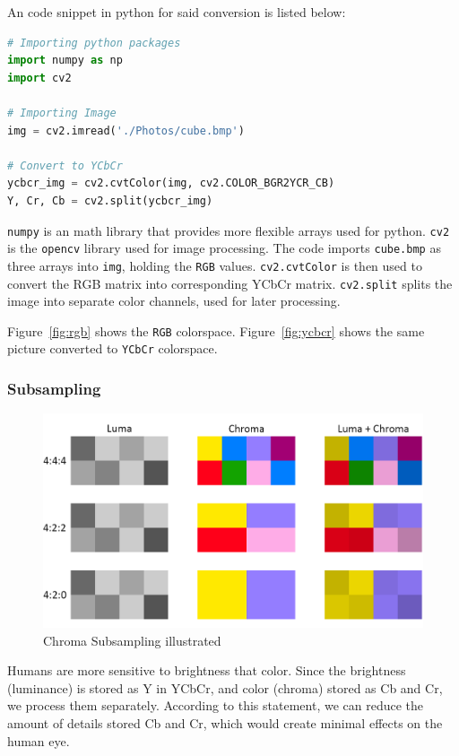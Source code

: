 \documentclass{article}
\begin{document}
An code snippet in python for said conversion is listed below:
\begin{lstlisting}[language=Python]
# Importing python packages
import numpy as np
import cv2

# Importing Image
img = cv2.imread('./Photos/cube.bmp')

# Convert to YCbCr
ycbcr_img = cv2.cvtColor(img, cv2.COLOR_BGR2YCR_CB)
Y, Cr, Cb = cv2.split(ycbcr_img)
\end{lstlisting}

\texttt{numpy} is an math library that provides more flexible arrays used for python.
\texttt{cv2} is the \texttt{opencv} library used for image processing.
The code imports \texttt{cube.bmp} as three arrays into \texttt{img}, holding the \texttt{RGB} values.
\texttt{cv2.cvtColor} is then used to convert the RGB matrix into corresponding YCbCr matrix.
\texttt{cv2.split} splits the image into separate color channels, used for later processing.

Figure~\ref{fig:rgb} shows the \texttt{RGB} colorspace.
Figure~\ref{fig:ycbcr} shows the same picture converted to \texttt{YCbCr} colorspace.

\subsubsection{Subsampling}

\begin{figure}
\includegraphics[width=\linewidth]{./figures/subsampling.png}
\caption{Chroma Subsampling illustrated}
\label{fig:subsampling}
\end{figure}

Humans are more sensitive to brightness that color.
Since the brightness (luminance) is stored as Y in YCbCr, and color (chroma) stored as Cb and Cr, we process them separately.
According to this statement, we can reduce the amount of details stored Cb and Cr, which would create minimal effects on the human eye.
\end{document}
